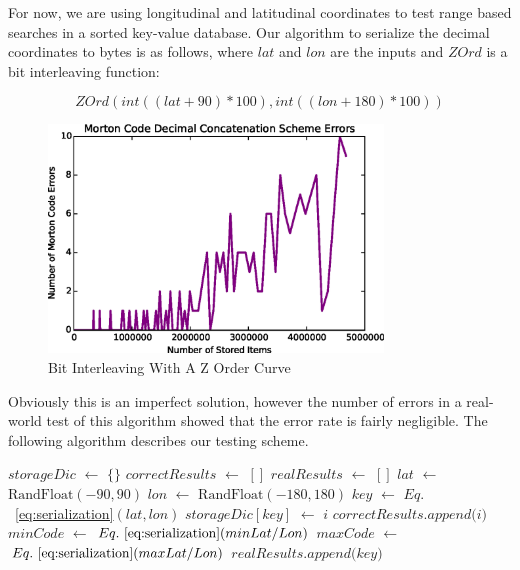 \documentclass[12pt]{IEEEtran}
\newcommand*\Let[2]{\State #1 $\gets$ #2}
\newcommand*\Append[2]{\State #1$.append($#2$)$}
\begin{document}
{\par For now, we are using longitudinal and latitudinal coordinates to test range based searches in a sorted key-value database. Our algorithm to serialize the decimal coordinates to bytes is as follows, where $lat$ and $lon$ are the inputs and $ZOrd$ is a bit interleaving function:

\begin{equation} \label{eq:serialization}
ZOrd(int((lat + 90) * 100), int((lon + 180) * 100))
\end{equation}

\begin{figure}[!t]
\centering
\includegraphics[width=3.5in]{errors.eps}
\caption{Bit Interleaving With A Z Order Curve}
\label{fig_ZOrd}
\end{figure}

\par Obviously this is an imperfect solution, however the number of errors in a real-world test of this algorithm showed that the error rate is fairly negligible. The following algorithm describes our testing scheme.
\begin{algorithm}
  \begin{algorithmic}[1]
  \vspace{-0.4cm}
    \Statex
        \Let{$storageDic$}{$\{\}$}
        \Let{$correctResults$}{$[]$}
        \Let{$realResults$}{$[]$}
            \Let{$lat$}{$\textrm{RandFloat}(-90,90)$}
            \Let{$lon$}{$\textrm{RandFloat}(-180,180)$}
            \Let{$key$}{$Eq.$~\ref{eq:serialization}$(lat,lon)$}
            \Let{$storageDic[key]$}{$i$}
                \Append{$correctResults$}{$i$}
            \EndIf
        \EndFor
        \Let{$minCode$}{$Eq.~\ref{eq:serialization}(minLat/Lon)$}
        \Let{$maxCode$}{$Eq.~\ref{eq:serialization}(maxLat/Lon)$}
                \Append{$realResults$}{$key$}
            \EndIf
        \EndFor
        \State {}
        

\end{algorithmic}
\end{algorithm}}
\end{document}

